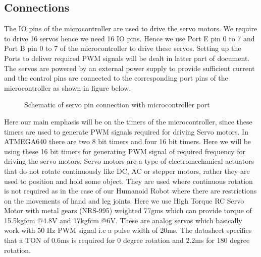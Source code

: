\documentclass[12pt]{article}
\begin{document}
\subsection{Connections}
The IO pins of the microcontroller are used to drive the servo motors. We require to drive
16 servos hence we need 16 IO pins. Hence we use Port E pin 0 to 7 and Port B pin 0 to 7
of the microcontroller to drive these servos. Setting up the Ports to deliver required PWM
signals will be dealt in latter part of document.
The servos are powered by an external power supply to provide sufficient current and the
control pins are connected to the corresponding port pins of the microcontroller as shown
in figure below.
\begin{figure}[h!]
	\centering
	\caption{Schematic of servo pin connection with microcontroller port}
\end{figure}
Here our main emphasis will be on the timers of the microcontroller, since these timers are
used to generate PWM signals required for driving Servo motors. In ATMEGA640 there
are two 8 bit timers and four 16 bit timers. Here we will be using these 16 bit timers for
generating PWM signal of required frequency for driving the servo motors.
Servo motors are a type of electromechanical actuators that do not rotate continuously like
DC, AC or stepper motors, rather they are used to position and hold some object. They are
used where continuous rotation is not required as in the case of our Humanoid Robot
where there are restrictions on the movements of hand and leg joints. Here we use High
Torque RC Servo Motor with metal gears (NRS-995) weighted 77gms which can provide
torque of 15.5kgfcm @4.8V and 17kgfcm @6V. These are analog servos which basically
work with 50 Hz PWM signal i.e a pulse width of 20ms. The datasheet specifies that a TON
of 0.6ms is required for 0 degree rotation and 2.2ms for 180 degree rotation.\\
\end{document}
